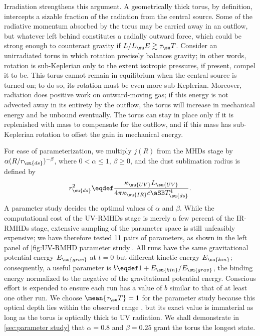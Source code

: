 \documentclass[twocolumn]{article}
\newcommand*\uvrmhd{\ac{UV}\protect\nobreakdash-\acp{RMHD}}
\newcommand*\irrmhd{\ac{IR}\protect\nobreakdash-\acp{RMHD}}
\begin{document}
Irradiation strengthens this argument. A geometrically thick torus, by
definition, intercepts a sizable fraction of the radiation from the central
source. Some of the radiative momentum absorbed by the torus may be carried
away in an outflow, but whatever left behind constitutes a radially outward
force, which could be strong enough to counteract gravity if $L/L_\su
E\gtrsim\tau_\su T$. Consider an unirradiated torus in which rotation precisely
balances gravity; in other words, rotation is sub-Keplerian only to the extent
isotropic pressures, if present, compel it to be. This torus cannot remain in
equilibrium when the central source is turned on; to do so, its rotation must
be even more sub-Keplerian. Moreover, radiation does positive work on
outward-moving gas; if this energy is not advected away in its entirety by the
outflow, the torus will increase in mechanical energy and be unbound
eventually. The torus can stay in place only if it is replenished with mass to
compensate for the outflow, and if this mass has sub-Keplerian rotation to
offset the gain in mechanical energy.

For ease of parameterization, we multiply $j(R)$ from the \acp{MHD} stage by
$\alpha (R/r_\su{ds})^{-\beta}$, where $0<\alpha\le1$, $\beta\ge0$, and the
dust sublimation radius is defined by 
\begin{equation}\label{eq:dust sublimation radius}
r_\su{ds}^2\eqdef
  \frac{\kappa_\su{UV}L_\su{UV}}{4\pi\kappa_\su{IR}c\aSB T_\su{ds}^4}.
\end{equation}
A parameter study decides the optimal values of $\alpha$ and $\beta$. While the
computational cost of the \uvrmhd{} stage is merely a few percent of the
\irrmhd{} stage, extensive sampling of the parameter space is still unfeasibly
expensive; we have therefore tested 11 pairs of parameters, as shown in the
left panel of \cref{fig:UV-RMHD parameter study}. All runs have the same
gravitational potential energy $E_\su{grav}$ at $t=0$ but different kinetic
energy $E_\su{kin}$; consequently, a useful parameter is
$b\eqdef1+E_\su{kin}/E_\su{grav}$, the binding energy normalized to the
negative of the gravitational potential energy. Conscious effort is expended to
ensure each run has a value of $b$ similar to that of at least one other run.
We choose $\mean{\tau_\su T}=1$ for the parameter study because this optical
depth lies within the observed range \citep[e.g.,][]{1999ApJ...522..157R}, but
its exact value is immaterial as long as the torus is optically thick to
\ac{UV} radiation. We shall demonstrate in \cref{sec:parameter study} that
$\alpha=0.8$ and $\beta=0.25$ grant the torus the longest 
state.
\end{document}
